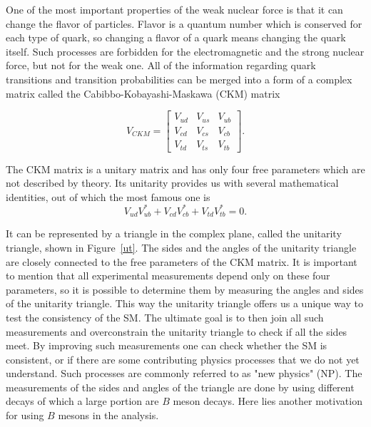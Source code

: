 \documentclass[headings=standardclasses,headings=big,oneside,a4paper,openany,12pt]{scrbook}
\begin{document}
One of the most important properties of the weak nuclear force is that it can change the flavor of particles. Flavor is a quantum number which is conserved for each type of quark, so changing a flavor of a quark means changing the quark itself. Such processes are forbidden for the electromagnetic and the strong nuclear force, but not for the weak one. All of the information regarding quark transitions and transition probabilities can be merged into a form of a complex matrix called the Cabibbo-Kobayashi-Maskawa (CKM) matrix \cite{cabibbo1963unitary,kobayashi1973cp}

\begin{equation}
V_{CKM} = \begin{bmatrix}
    V_{ud} & V_{us} & V_{ub}\\
	V_{cd} & V_{cs} & V_{cb}\\
	V_{td} & V_{ts} & V_{tb}
\end{bmatrix}.
\end{equation}

The CKM matrix is a unitary matrix and has only four free parameters which are not described by theory. Its unitarity provides us with several mathematical identities, out of which the most famous one is
\begin{equation}
V_{ud}V_{ub}^* + V_{cd}V_{cb}^* + V_{td}V_{tb}^* = 0.
\end{equation}

It can be represented by a triangle in the complex plane, called the unitarity triangle, shown in Figure~\ref{ut}. The sides and the angles of the unitarity triangle are closely connected to the free parameters of the CKM matrix. It is important to mention that all experimental measurements depend only on these four parameters, so it is possible to determine them by measuring the angles and sides of the unitarity triangle. This way the unitarity triangle offers us a unique way to test the consistency of the SM. The ultimate goal is to then join all such measurements and overconstrain the unitarity triangle to check if all the sides meet. By improving such measurements one can check whether the SM is consistent, or if there are some contributing physics processes that we do not yet understand. Such processes are commonly referred to as "new physics" (NP). The measurements of the sides and angles of the triangle are done by using different decays of which a large portion are $B$ meson decays. Here lies another motivation for using $B$ mesons in the analysis.
\end{document}
